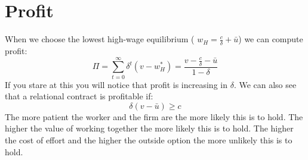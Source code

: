\documentclass[14pt]{article}
\begin{document}
\section{Profit}
When we choose the lowest high-wage equilibrium ( $w_H= \frac{c}{\delta}+  \bar u$) we can compute profit:
\[\Pi = \sum_{t=0}^\infty \delta^t (v-w_H^*)=\frac{v-\frac{c}{\delta}-\bar u}{1-\delta}\]
If you stare at this you will notice that profit is increasing in $\delta$. We can also see that a relational contract is profitable if:
\[\delta(v-\bar u) \geq c\]
The more patient the worker and the firm are the more likely this is to hold. The higher the value of working together the more likely this is to hold. The higher the cost of effort and the higher the outside option the more unlikely this is to hold.





\end{document}
